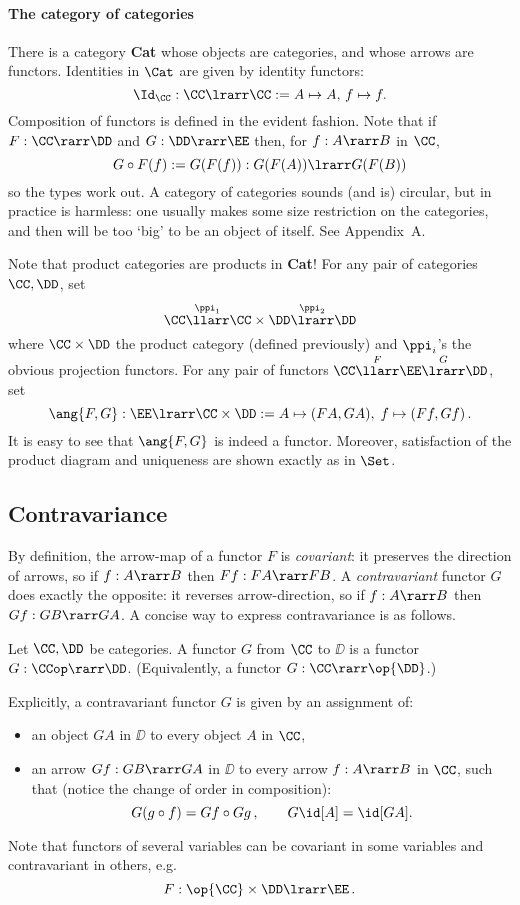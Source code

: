 \documentclass{svmult}
\begin{document}
\paragraph{The category of categories}
There is a category \textbf{Cat} whose objects are categories, and whose arrows are functors. Identities in $\Cat$ are given by identity functors:
\[ \Id_\CC:\CC\lrarr\CC:=A\mapsto A,\, f\mapsto f. \]
Composition of functors is defined in the evident
fashion. Note that if $F:\CC \rarr \DD$ and $G : \DD \rarr \EE$ then, for $f : A \rarr B$ in $\CC$,
\[ G \circ F (f) := G(F(f)) : G(F(A))  \lrarr G(F(B)) \]
so the types work out.
%
A category of categories sounds (and is) circular, but in practice is harmless: one usually makes some size restriction on the categories, and then  will be too `big' to be an object of itself. See Appendix~A.

Note that product categories are products in \textbf{Cat}! For any pair of categories $\CC,\DD$, set
\[ \CC\overset{\ppi_1}{\llarr}\CC\times\DD\overset{\ppi_2}{\lrarr}\DD \]
where $\CC\times\DD$ the product category (defined previously) and $\ppi_i$'s the obvious projection functors. For any pair of functors
$\CC\overset{F}{\llarr}\EE\overset{G}{\lrarr}\DD$, set
\[ \ang{F,G}:\EE\lrarr\CC\times \DD:=A\mapsto(FA,GA),\;f\mapsto(Ff,Gf)\,. \]
It is easy to see that $\ang{F,G}$ is indeed a functor. Moreover, satisfaction of the product diagram and uniqueness are shown exactly as in $\Set$.

\subsection{Contravariance}
By definition, the arrow-map of a functor $F$ is \emph{covariant}: it preserves the direction of arrows, so if $f:A\rarr B$ then $Ff:FA\rarr FB$. A
\emph{contravariant} functor $G$ does exactly the opposite: it reverses arrow-direction, so if $f:A\rarr B$ then $Gf:GB\rarr GA$. A concise way to
express contravariance is as follows.

\begin{mydefinition}
Let $\CC,\DD$ be categories. A  functor $G$ from $\CC$ to $\DD$ is a functor $G:\CCop\rarr\DD$.
(Equivalently, a functor $G : \CC \rarr \op{\DD}$.)\deq
\end{mydefinition}
%
Explicitly, a contravariant functor $G$ is given by an assignment of:
\begin{itemize}
\item an object $GA$ in $\DD$ to every object $A$ in $\CC$,
\item an arrow $Gf:GB\rarr GA$ in $\DD$ to every arrow $f:A\rarr B$ in $\CC$, such that (notice the change of order in composition):
\[ G(g \circ f) = Gf \circ Gg\,,\qquad G \id[A] = \id[GA] . \]
\end{itemize}
%
Note that functors of several variables  can be covariant in some variables and contravariant in others, e.g.
\[ F : \op{\CC} \times \DD \lrarr \EE\, . \]
\end{document}
